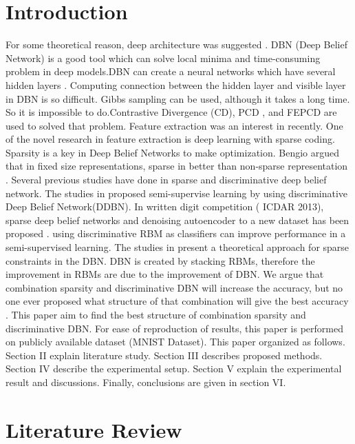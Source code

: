 \documentclass[conference]{IEEEtran}
\begin{document}
\section{Introduction}
For some theoretical reason, deep architecture was
suggested \cite{keyvanrad1}.
DBN (Deep Belief Network) is a good tool which can solve local minima and time-consuming problem in deep models.DBN can create a neural
networks which have several hidden layers \cite{liu1}.
Computing connection between the hidden layer and visible
layer in DBN is so difficult. Gibbs sampling can be used,
although it takes a long time. So it is impossible to
do.Contrastive Divergence (CD)\cite{carreiraperpinan1}, PCD \cite{tieleman1}, and FEPCD \cite{keyvanrad2}
are used to solved that problem.
Feature extraction was an interest in recently. One of the novel research in feature extraction is deep learning with sparse coding\cite{olshausen1}. Sparsity is a key in Deep Belief Networks to make optimization. Bengio argued that in fixed size representations, sparse in better than non-sparse representation \cite{bengio1}.
Several previous studies have done in sparse and
discriminative deep belief network. The studies in\cite{tieleman1}
proposed semi-supervise learning by using discriminative
Deep Belief Network(DDBN). In written digit competition ( ICDAR 2013), sparse deep
belief networks and denoising autoencoder to a new dataset has been proposed \cite{walid1}.\cite{larochelle1} using discriminative RBM as classifiers can
improve performance in a semi-supervised learning. The
studies in\cite{halkias1} present a theoretical approach for sparse
constraints in the DBN.
DBN is created by stacking RBMs, therefore the improvement in RBMs are due to the improvement of DBN. We argue that combination sparsity and discriminative
DBN will increase the accuracy, but no one ever proposed
what structure of that combination will give the best accuracy .
This paper aim to find the best structure of combination
sparsity and discriminative DBN. For ease of reproduction of
results, this paper is performed on publicly available dataset
(MNIST Dataset). This paper organized as follows. Section II
explain literature study. Section III describes proposed
methods. Section IV describe the experimental setup. Section
V explain the experimental result and discussions. Finally,
conclusions are given in section VI.

\section{Literature Review}
\end{document}
